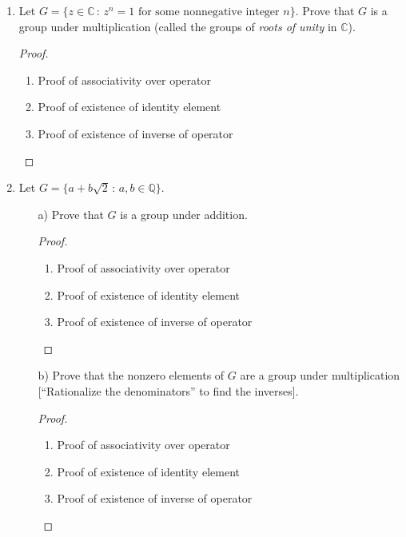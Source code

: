 \documentclass[11pt]{article}
\theoremstyle{definition}  %
\newcommand{\Q}{\mathbb{Q}}
\newcommand{\C}{\mathbb{C}}
\begin{document}
\begin{enumerate}
\begin{proof}
   \end{proof}
   \begin{proof} Proof that G is a group
     \begin{enumerate}
       \item Proof of associativity over operator
       \item Proof of existence of identity element
       \item  Proof of existence of inverse of operator
     \end{enumerate}
   \end{proof}
\item Let $G = \{z \in \C \, : \, z^n = 1 \mbox{  for some nonnegative integer  } n\}$. Prove that $G$ is a group under multiplication (called the groups of {\it roots of unity} in $\C$).
\begin{proof}
  \begin{enumerate}
    \item Proof of associativity over operator
    \item Proof of existence of identity element
    \item  Proof of existence of inverse of operator
  \end{enumerate}
\end{proof}
\item Let $G = \{ a + b\sqrt{2} \, : \, a, b \in \Q\}$.
  \begin{itemize}
  \item[a)] Prove that $G$ is a group under addition.
  \begin{proof}
    \begin{enumerate}
      \item Proof of associativity over operator
      \item Proof of existence of identity element
      \item  Proof of existence of inverse of operator
    \end{enumerate}
  \end{proof}
   \item[b)] Prove that the nonzero elements of $G$ are a group under multiplication [``Rationalize the denominators'' to find the inverses].
   \begin{proof}
     \begin{enumerate}
       \item Proof of associativity over operator
       \item Proof of existence of identity element
       \item  Proof of existence of inverse of operator
     \end{enumerate}
   \end{proof}
  \end{itemize}
 \end{enumerate}
\end{document}
